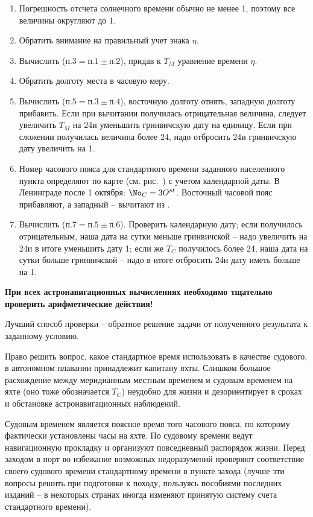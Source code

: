 \begin{enumerate} 
\item Погрешность отсчета солнечного времени обычно не менее 1\tmin, поэтому все величины округляют до 1\tmin.
\item Обратить внимание на правильный учет знака $\eta$.
\item Вычислить ($\text{п.}3 = \text{п.}1 \pm \text{п.}2$), придав к $T_M$ уравнение времени $\eta$.
\item Обратить долготу места в часовую меру.
\item Вычислить ($\text{п.}5 = \text{п.}3 \pm \text{п.}4$), восточную долготу отнять, западную долготу прибавить. Если при вычитании получилась отрицательная величина, следует увеличить $T_M$ на 24\thr и уменьшить гринвичскую дату на единицу. Если при сложении получилась величина более 24\thr, надо отбросить 24\thr и гринвичскую дату увеличить на 1\tday.
\item Номер часового пояса для стандартного времени заданного населенного пункта определяют по карте (см. рис.~) с учетом календарной даты. В Ленинграде после 1 октября: $\mathNo_C = 3 \Ost$. Восточный часовой пояс прибавляют, а западный \--- вычитают из \Tgr.
\item Вычислить ($\text{п.}7 = \text{п.}5 \pm \text{п.}6$). Проверить календарную дату; если  получилось отрицательным, наша дата на сутки меньше гринвичской \--- надо увеличить \Tgr на 24\thr и в итоге уменьшить дату 1\tday; если же $T_C$ получилось более 24\thr, наша дата на сутки больше гринвичской \--- надо в итоге отбросить 24\thr и дату иметь больше на 1\tday.
\end{enumerate}

\textbf{При всех астронавигационных вычислениях необходимо тщательно проверить арифметические действия!} 

Лучший способ проверки \--- обратное решение задачи от полученного результата к заданному условию.

Право решить вопрос, какое стандартное время использовать в качестве судового, в автономном плавании принадлежит капитану яхты. Слишком большое расхождение между меридианным местным временем и судовым временем на яхте (оно тоже обозначается $T_C$) неудобно для жизни и дезориентирует в сроках и обстановке астронавигационных наблюдений.

Судовым временем является поясное время того часового пояса, по которому фактически установлены часы на яхте. По судовому времени ведут навигационную прокладку и организуют повседневный распорядок жизни. Перед заходом в порт во избежание возможных недоразумений проверяют соответствие своего судового времени стандартному времени в пункте захода (лучше эти вопросы решить при подготовке к походу, пользуясь пособиями последних изданий \--- в некоторых странах иногда изменяют принятую систему счета стандартного времени).


